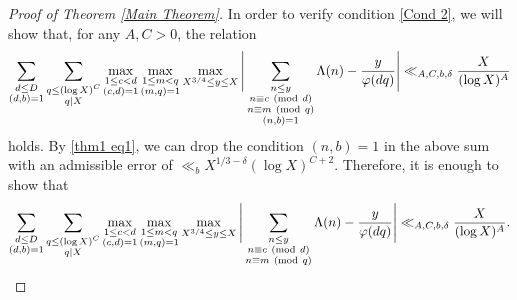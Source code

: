 \documentclass[12pt]{amsart}
\numberwithin{equation}{section}
\theoremstyle{remark}
\theoremstyle{definition}
\newcommand{\imod}[1]{\ (\mathrm{mod}\ #1)}
\begin{document}
\begin{proof}[Proof of Theorem \ref{Main Theorem}]
 In order to verify condition \ref{Cond 2}, we will show that, for any $A, C>0$, the relation
\begin{align}
\notag \sum_{\substack{d\leq D\\(d, b)=1}}\sum_{\substack{q\leq (\log X)^{C}\\q|X}}\max_{\substack{1\leq c<d\\(c, d)=1}}\max_{\substack{1\leq m<q\\(m, q)=1}}\max_{X^{3/4}\leq y \leq X}\Bigg|\sum_{\substack{n\leq y\\n\equiv c\imod d\\ n\equiv m\imod q\\(n, b)=1} }\Lambda(n)-\dfrac{ y}{\varphi(dq)}\Bigg| \ll_{A, C, b, \delta} \dfrac{X}{(\log X)^A}
\end{align}
holds. By \eqref{thm1 eq1}, we can drop the condition $(n, b)=1$ in the above sum with an admissible error of $\ll_{b}X^{1/3-\delta}(\log X)^{C+2}$. Therefore, it is enough to show that
\begin{align}
\notag \sum_{\substack{d\leq D\\(d, b)=1}}\sum_{\substack{q\leq (\log X)^{C}\\q|X}}\max_{\substack{1\leq c<d\\(c, d)=1}}\max_{\substack{1\leq m<q\\(m, q)=1}}\max_{X^{3/4}\leq y \leq X}\Bigg|\sum_{\substack{n\leq y\\n\equiv c\imod d\\ n\equiv m\imod q} }\Lambda(n)-\dfrac{ y}{\varphi(dq)}\Bigg| \ll_{A, C, b, \delta} \dfrac{X}{(\log X)^A}.
\end{align}


\end{proof}
\end{document}
